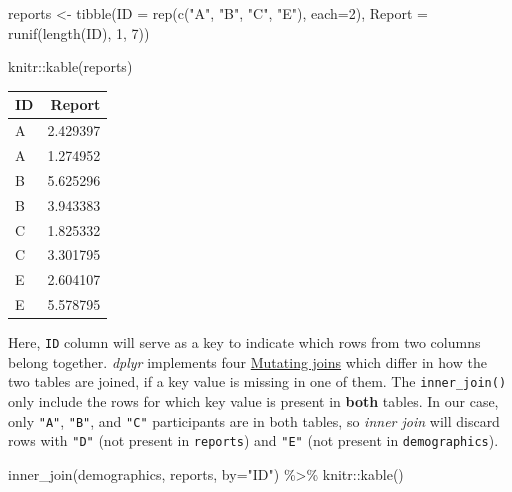 \documentclass[
]{book}
\newenvironment{Shaded}{\begin{snugshade}}{\end{snugshade}}
\newcommand{\AttributeTok}[1]{\textcolor[rgb]{0.77,0.63,0.00}{#1}}
\newcommand{\DecValTok}[1]{\textcolor[rgb]{0.00,0.00,0.81}{#1}}
\newcommand{\FunctionTok}[1]{\textcolor[rgb]{0.00,0.00,0.00}{#1}}
\newcommand{\NormalTok}[1]{#1}
\newcommand{\OtherTok}[1]{\textcolor[rgb]{0.56,0.35,0.01}{#1}}
\newcommand{\SpecialCharTok}[1]{\textcolor[rgb]{0.00,0.00,0.00}{#1}}
\newcommand{\StringTok}[1]{\textcolor[rgb]{0.31,0.60,0.02}{#1}}
\begin{document}
\begin{Shaded}
\begin{Highlighting}[]
\NormalTok{reports }\OtherTok{\textless{}{-}} \FunctionTok{tibble}\NormalTok{(}\AttributeTok{ID =} \FunctionTok{rep}\NormalTok{(}\FunctionTok{c}\NormalTok{(}\StringTok{"A"}\NormalTok{, }\StringTok{"B"}\NormalTok{, }\StringTok{"C"}\NormalTok{, }\StringTok{"E"}\NormalTok{), }\AttributeTok{each=}\DecValTok{2}\NormalTok{),}
                  \AttributeTok{Report =} \FunctionTok{runif}\NormalTok{(}\FunctionTok{length}\NormalTok{(ID), }\DecValTok{1}\NormalTok{, }\DecValTok{7}\NormalTok{))}

\NormalTok{knitr}\SpecialCharTok{::}\FunctionTok{kable}\NormalTok{(reports)}
\end{Highlighting}
\end{Shaded}

\begin{tabular}{l|r}
\hline
ID & Report\\
\hline
A & 2.429397\\
\hline
A & 1.274952\\
\hline
B & 5.625296\\
\hline
B & 3.943383\\
\hline
C & 1.825332\\
\hline
C & 3.301795\\
\hline
E & 2.604107\\
\hline
E & 5.578795\\
\hline
\end{tabular}

Here, \texttt{ID} column will serve as a key to indicate which rows from two columns belong together. \emph{dplyr} implements four \href{https://dplyr.tidyverse.org/reference/mutate-joins.html}{Mutating joins} which differ in how the two tables are joined, if a key value is missing in one of them. The \texttt{inner\_join()} only include the rows for which key value is present in \textbf{both} tables. In our case, only \texttt{"A"}, \texttt{"B"}, and \texttt{"C"} participants are in both tables, so \emph{inner join} will discard rows with \texttt{"D"} (not present in \texttt{reports}) and \texttt{"E"} (not present in \texttt{demographics}).

\begin{Shaded}
\begin{Highlighting}[]
\FunctionTok{inner\_join}\NormalTok{(demographics, reports, }\AttributeTok{by=}\StringTok{"ID"}\NormalTok{) }\SpecialCharTok{\%\textgreater{}\%}
\NormalTok{  knitr}\SpecialCharTok{::}\FunctionTok{kable}\NormalTok{()}
\end{Highlighting}
\end{Shaded}
\end{document}
